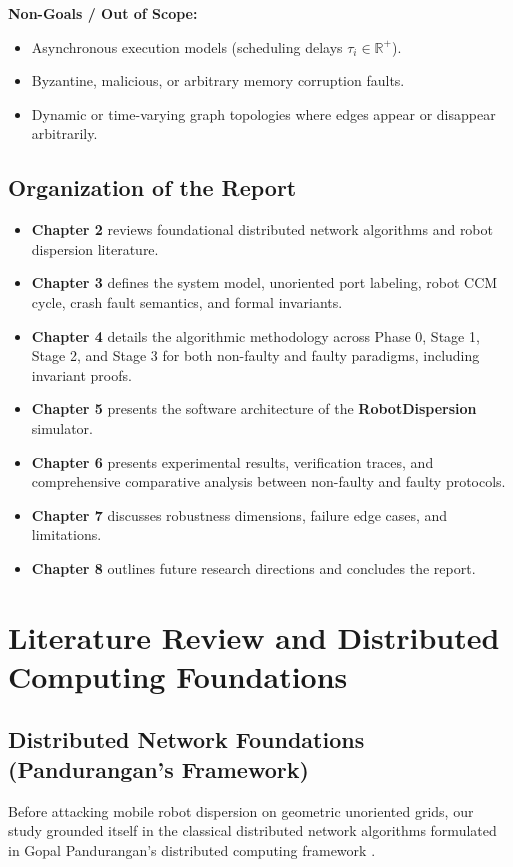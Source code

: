 \documentclass[11pt,a4paper]{report}
\begin{document}
\textbf{Non-Goals / Out of Scope:}
\begin{itemize}
    \item Asynchronous execution models (scheduling delays $\tau_i \in \mathbb{R}^+$).
    \item Byzantine, malicious, or arbitrary memory corruption faults.
    \item Dynamic or time-varying graph topologies where edges appear or disappear arbitrarily.
\end{itemize}

\section{Organization of the Report}
\begin{itemize}
    \item \textbf{Chapter 2} reviews foundational distributed network algorithms and robot dispersion literature.
    \item \textbf{Chapter 3} defines the system model, unoriented port labeling, robot CCM cycle, crash fault semantics, and formal invariants.
    \item \textbf{Chapter 4} details the algorithmic methodology across Phase 0, Stage 1, Stage 2, and Stage 3 for both non-faulty and faulty paradigms, including invariant proofs.
    \item \textbf{Chapter 5} presents the software architecture of the \textbf{RobotDispersion} simulator.
    \item \textbf{Chapter 6} presents experimental results, verification traces, and comprehensive comparative analysis between non-faulty and faulty protocols.
    \item \textbf{Chapter 7} discusses robustness dimensions, failure edge cases, and limitations.
    \item \textbf{Chapter 8} outlines future research directions and concludes the report.
\end{itemize}

\chapter{Literature Review and Distributed Computing Foundations}

\section{Distributed Network Foundations (Pandurangan's Framework)}
Before attacking mobile robot dispersion on geometric unoriented grids, our study grounded itself in the classical distributed network algorithms formulated in Gopal Pandurangan's distributed computing framework \cite{pandurangan2021distributed}.
\end{document}
